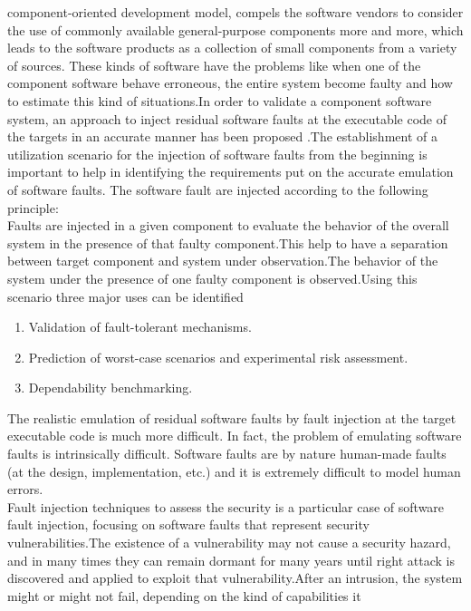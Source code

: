 component-oriented development model, compels the software vendors to consider the use of commonly available general-purpose components more and more, which leads to the software products as a collection of small components from a variety of sources. These kinds of software have the problems like when one of the component software behave erroneous, the entire system become faulty and how to estimate this kind of situations.In order to validate a component software system, an approach to inject
residual software faults at the executable code of the targets
in an accurate manner has been proposed \cite{5}.The establishment
of a utilization scenario for the injection of software faults
from the beginning is important to help in identifying the
requirements put on the accurate emulation of software
faults.
The software fault are injected according to the following principle:\\
\newline
Faults are injected in a given component to evaluate the behavior of
the overall system in the presence of that faulty component.This help to have a separation between target component and system under observation.The behavior of the system under the presence of one faulty component is observed.Using this scenario three major uses can be identified 
\begin{enumerate}
	\item Validation of fault-tolerant mechanisms.
	\item Prediction of worst-case scenarios and experimental risk assessment.
	\item Dependability benchmarking.
\end{enumerate}
The realistic emulation of residual software faults by fault injection at the target executable code is much more difficult. In fact, the problem of emulating software faults is intrinsically difficult. Software faults are by nature human-made faults (at the design, implementation, etc.) and it is extremely difficult to model human errors.\\
\newline
Fault injection techniques to assess the security
is a particular case of software fault injection,
focusing on software faults that represent security vulnerabilities.The existence of a vulnerability may not cause
a security hazard, and in many times they can remain dormant for many years until right attack is discovered and applied to exploit that vulnerability.After an intrusion, the system might
or might not fail, depending on the kind of capabilities it
